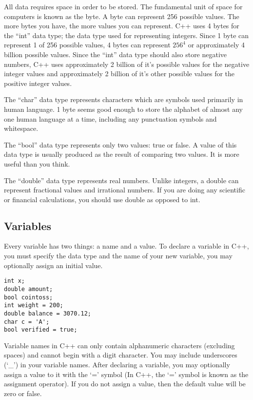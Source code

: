 \documentclass[a4paper,12pt]{article}
\begin{document}
All data requires space in order to be stored. The fundamental unit of space for computers is known as the byte. A byte can represent 256 possible values. The more bytes you have, the more values you can represent. C++ uses 4 bytes for the ``int'' data type; the data type used for representing integers. Since 1 byte can represent 1 of 256 possible values, 4 bytes can represent $256^4$ or approximately 4 billion possible values. Since the ``int'' data type should also store negative numbers, C++ uses approximately 2 billion of it's possible values for the negative integer values and approximately 2 billion of it's other possible values for the positive integer values.

The ``char'' data type represents characters which are symbols used primarily in human language. 1 byte seems good enough to store the alphabet of almost any one human language at a time, including any punctuation symbols and whitespace. 

The ``bool'' data type represents only two values: true or false. A value of this data type is usually produced as the result of comparing two values. It is more useful than you think.

The ``double'' data type represents real numbers. Unlike integers, a double can represent fractional values and irrational numbers. If you are doing any scientific or financial calculations, you should use double as opposed to int. 

\subsection*{Variables}

Every variable has two things: a name and a value. To declare a variable in C++, you must specify the data type and the name of your new variable, you may optionally assign an initial value. 
\begin{lstlisting}[caption=A series of declaration statements in C++]
int x;
double amount;
bool cointoss;
int weight = 200;
double balance = 3070.12;
char c = 'A';
bool verified = true;
\end{lstlisting}

Variable names in C++ can only contain alphanumeric characters (excluding spaces) and cannot begin with a digit character. You may include underscores (`\_') in your variable names. After declaring a variable, you may optionally assign a value to it with the `=' symbol (In C++, the `=' symbol is known as the assignment operator). If you do not assign a value, then the default value will be zero or false. 
\end{document}
